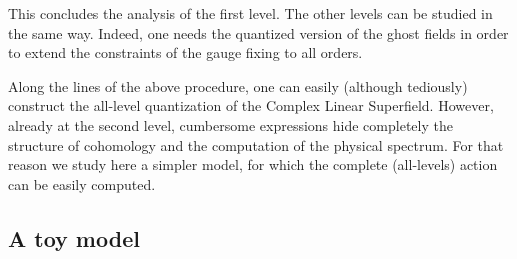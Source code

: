 \documentclass[a4paper,12pt]{article}
\begin{document}
This concludes the analysis of the first level. The other levels can
be studied in the same way. Indeed, one needs the quantized version of
the ghost fields in order to extend the constraints of the gauge
fixing to all orders.
 
Along the lines of the above procedure, one can easily (although
tediously) construct the all-level quantization of the Complex Linear
Superfield. However, already at the second level, cumbersome
expressions hide completely the structure of cohomology and the
computation of the physical spectrum. For that reason we study here a
simpler model, for which the complete (all-levels) action can be easily
computed.


\subsection{A toy model}
\label{toy_model}
\end{document}
